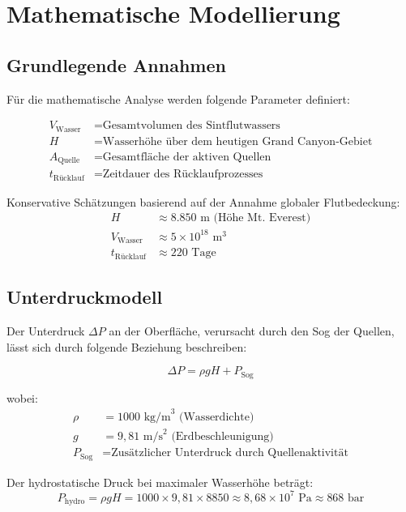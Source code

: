 ﻿\documentclass[12pt,a4paper]{report}
\begin{document}
\chapter{Mathematische Modellierung}

\section{Grundlegende Annahmen}

Für die mathematische Analyse werden folgende Parameter definiert:

\begin{align}
	V_{\text{Wasser}} &= \text{Gesamtvolumen des Sintflutwassers} \\
	H &= \text{Wasserhöhe über dem heutigen Grand Canyon-Gebiet} \\
	A_{\text{Quelle}} &= \text{Gesamtfläche der aktiven Quellen} \\
	t_{\text{Rücklauf}} &= \text{Zeitdauer des Rücklaufprozesses}
\end{align}

Konservative Schätzungen basierend auf der Annahme globaler Flutbedeckung:
\begin{align}
	H &\approx 8.850 \text{ m (Höhe Mt. Everest)} \\
	V_{\text{Wasser}} &\approx 5 \times 10^{18} \text{ m}^3 \\
	t_{\text{Rücklauf}} &\approx 220 \text{ Tage}
\end{align}

\section{Unterdruckmodell}

Der Unterdruck $\Delta P$ an der Oberfläche, verursacht durch den Sog der Quellen, lässt sich durch folgende Beziehung beschreiben:

\begin{equation}
	\Delta P = \rho g H + P_{\text{Sog}}
\end{equation}

wobei:
\begin{align}
	\rho &= 1000 \text{ kg/m}^3 \text{ (Wasserdichte)} \\
	g &= 9{,}81 \text{ m/s}^2 \text{ (Erdbeschleunigung)} \\
	P_{\text{Sog}} &= \text{Zusätzlicher Unterdruck durch Quellenaktivität}
\end{align}

Der hydrostatische Druck bei maximaler Wasserhöhe beträgt:
\begin{equation}
	P_{\text{hydro}} = \rho g H = 1000 \times 9{,}81 \times 8850 \approx 8{,}68 \times 10^7 \text{ Pa} \approx 868 \text{ bar}
\end{equation}
\end{document}

